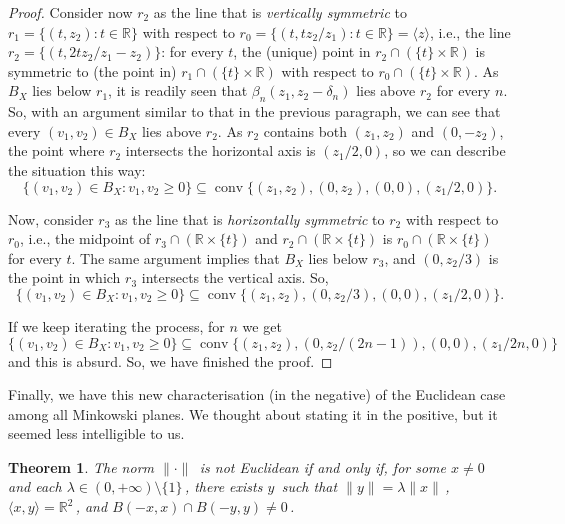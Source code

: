 \documentclass[12pt]{amsproc}
\newtheorem{theorem}{Theorem}[section]
\theoremstyle{remark}
\def\conv{\operatorname{conv}}
\def\R{\mathbb R}
\def\norma{\|\cdot\|}
\begin{document}
\begin{proof}
Consider now $r_2$ as the line that is {\em vertically symmetric} to 
$r_1=\{(t,z_2):t\in\R\}$ with respect to $r_0=\{(t,tz_2/z_1):t\in\R\}=\langle z\rangle$, i.e., 
the line $r_2=\{(t,2tz_2/z_1-z_2)\}$: for every $t$, the (unique) point in 
$r_2\cap(\{t\}\times\R)$ is symmetric to (the point in) $r_1\cap(\{t\}\times\R)$ 
with respect to $r_0\cap(\{t\}\times\R)$. As $B_X$ lies below $r_1$, it is readily seen that 
$\beta_n(z_1,z_2-\delta_n)$ lies above $r_2$ for every $n$. So, with an argument similar to that in 
the previous paragraph, we can see that every $(v_1,v_2)\in B_X$ lies above $r_2$. 
As $r_2$ contains both $(z_1,z_2)$ and $(0,-z_2)$, the point where $r_2$ intersects 
the horizontal axis is $(z_1/2,0)$, so we can describe the situation this way:
$$\{(v_1,v_2)\in B_X:v_1, v_2\geq 0\}\subseteq\conv\{(z_1,z_2),(0,z_2),(0,0),(z_1/2,0)\}.$$


Now, consider $r_3$ as the line that is {\em horizontally symmetric} to $r_2$ 
with respect to $r_0$, i.e., the midpoint of $r_3\cap(\R\times \{t\})$ and $r_2\cap(\R\times \{t\})$ 
is $r_0\cap(\R\times \{t\})$ for every $t$. The same argument implies that $B_X$ lies below 
$r_3$, and $(0,z_2/3)$ is the point in which $r_3$ intersects the vertical axis. So, 
$$\{(v_1,v_2)\in B_X:v_1, v_2\geq 0\}\subseteq\conv\{(z_1,z_2),(0,z_2/3),(0,0),(z_1/2,0)\}.$$

If we keep iterating the process, for $n$ we get 
$$\{(v_1,v_2)\in B_X:v_1, v_2\geq 0\}\subseteq\conv\{(z_1,z_2),(0,z_2/(2n-1)),(0,0),(z_1/2n,0)\}$$
and this is absurd. So, we have finished the proof. 
\end{proof}

Finally, we have this new characterisation (in the negative) of the Euclidean case among all Minkowski planes. 
We thought about stating it in the positive, but it seemed less intelligible to us. 

\begin{theorem}\label{maintheorem}
The norm $\norma\,$ is not Euclidean if and only if, for some $x\neq 0\,$ and each $\lambda\in (0,+\infty)\setminus \{1\}\,$, there exists $y\,$ such that 
$\|y\|=\lambda \|x\|\,$, $\langle x,y\rangle =\mathbb{R}^2\,$, and $B(-x,x)\cap B(-y,y)\neq 0\,$.
\end{theorem}
\end{document}
